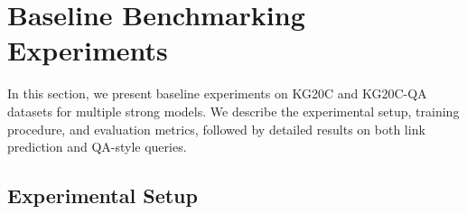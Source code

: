 \documentclass[conference]{IEEEtran}
\begin{document}
%


\section{Baseline Benchmarking Experiments} \label{sect:baseline}

In this section, we present baseline experiments on KG20C and KG20C-QA datasets for multiple strong models. We describe the experimental setup, training procedure, and evaluation metrics, followed by detailed results on both link prediction and QA-style queries.

\subsection{Experimental Setup}
\end{document}
